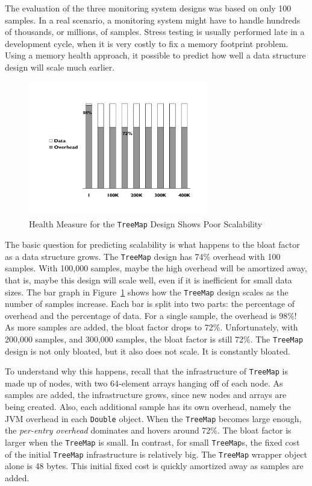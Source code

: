 The evaluation of the three monitoring system designs was based on only 100 samples. In a real scenario, a monitoring system might have to handle hundreds of thousands, or millions, of samples. Stress testing is usually performed late in a development cycle, when it is very costly to fix a memory footprint problem. Using a memory health approach, it possible to predict how well a data structure design will scale much earlier.
 
\begin{figure}
  \centering
  \includegraphics[width=0.7\textwidth]{Figures/chapter3/scalable-health-treemap}
  \caption{Health Measure for the \texttt{TreeMap} Design Shows Poor Scalability}
  \label{fig:scalable-health-treemap}
\end{figure}
The basic question for predicting scalability is what happens to the bloat factor as a data structure grows. The \texttt{TreeMap} design has 74\% overhead with 100 samples. With 100,000 samples, maybe the high overhead will be amortized away, that is, maybe this design will scale well, even if it is inefficient for small data sizes. The bar graph in Figure~\ref{fig:scalable-health-treemap} shows how the \texttt{TreeMap} design scales as the number of samples increase. Each bar is split into two parts: the percentage of overhead and the percentage of data. For a single sample, the overhead is 98\%! As more samples are added, the bloat factor drops to 72\%. Unfortunately, with 200,000 samples, and 300,000 samples, the bloat factor is still 72\%. The \texttt{TreeMap} design is not only bloated, but it also does not scale. It is constantly bloated.

To understand why this happens, recall that the infrastructure of \texttt{TreeMap} is made up of nodes, with two 64-element arrays hanging off of each node. As samples are added, the infrastructure grows, since new nodes and arrays are being created. Also, each additional sample has its own overhead, namely the JVM overhead in each \texttt{Double} object. When the \texttt{TreeMap} becomes large enough, the \textit{per-entry overhead} dominates and hovers around 72\%. The bloat factor is larger when the \texttt{TreeMap} is small. In contrast, for small \texttt{TreeMap}s, the fixed cost of the initial \texttt{TreeMap} infrastructure is relatively big. The \texttt{TreeMap} wrapper object alone is 48 bytes. This initial fixed cost is quickly amortized away as samples are added. 

